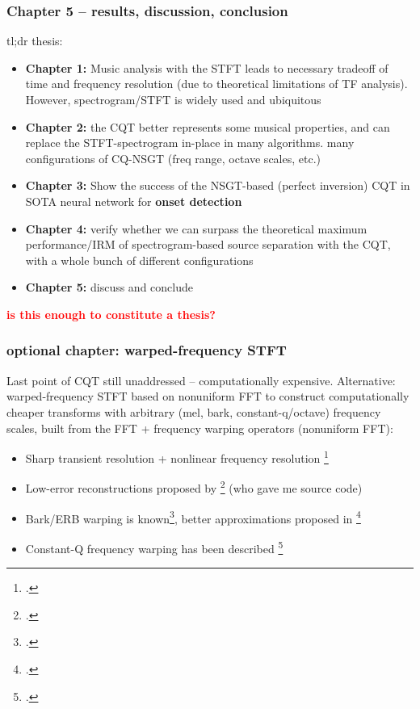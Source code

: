 \documentclass[usenames,dvipsnames]{beamer}
\begin{document}
\begin{frame}
	\frametitle{Chapter 5 -- results, discussion, conclusion}
	tl;dr thesis:
	\begin{itemize}
		\item
			\textbf{Chapter 1:} Music analysis with the STFT leads to necessary tradeoff of time and frequency resolution (due to theoretical limitations of TF analysis). However, spectrogram/STFT is widely used and ubiquitous
		\item
			\textbf{Chapter 2:} the CQT better represents some musical properties, and can replace the STFT-spectrogram in-place in many algorithms. many configurations of CQ-NSGT (freq range, octave scales, etc.)
		\item
			\textbf{Chapter 3:} Show the success of the NSGT-based (perfect inversion) CQT in SOTA neural network for \textbf{onset detection}
		\item
			\textbf{Chapter 4:} verify whether we can surpass the theoretical maximum performance/IRM of spectrogram-based source separation with the CQT, with a whole bunch of different configurations
		\item
			\textbf{Chapter 5:} discuss and conclude
	\end{itemize}
	\textcolor{red}{\textbf{is this enough to constitute a thesis?}}
\end{frame}

\begin{frame}
	\frametitle{\textbf{optional chapter}: warped-frequency STFT}
	Last point of CQT still unaddressed -- computationally expensive. Alternative: warped-frequency STFT based on nonuniform FFT to construct computationally cheaper transforms with arbitrary (mel, bark, constant-q/octave) frequency scales, built from the FFT + frequency warping operators (nonuniform FFT):
	\begin{itemize}
		\item
			Sharp transient resolution + nonlinear frequency resolution \footcite{warpwabnik}
		\item
			Low-error reconstructions proposed by \footcite{makur2008} (who gave me source code)
		\item
			Bark/ERB warping is known\footcite{barkerb}, better approximations proposed in \footcite{betterwarp}
		\item
			Constant-Q frequency warping has been described \footcite{cqwarp}
	\end{itemize}
\end{frame}
\end{document}
